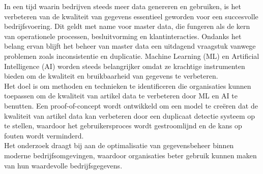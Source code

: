 In een tijd waarin bedrijven steeds meer data genereren en gebruiken, is het verbeteren van de kwaliteit van gegevens essentieel geworden voor een succesvolle bedrijfsvoering. Dit geldt met name voor master data, die fungeren als de kern van operationele processen, besluitvorming en klantinteracties. Ondanks het belang ervan blijft het beheer van master data een uitdagend vraagstuk vanwege problemen zoals inconsistentie en duplicatie. Machine Learning (ML) en Artificial Intelligence (AI) worden steeds belangrijker omdat ze krachtige instrumenten bieden om de kwaliteit en bruikbaarheid van gegevens te verbeteren.
\\
Het doel is om methoden en technieken te identificeren die organisaties kunnen toepassen om de kwaliteit van artikel data te verbeteren door ML en AI te benutten. Een proof-of-concept wordt ontwikkeld om een model te creëren dat de kwaliteit van artikel data kan verbeteren door een duplicaat detectie systeem op te stellen, waardoor het gebruikersproces wordt gestroomlijnd en de kans op fouten wordt verminderd. 
\\
Het onderzoek draagt bij aan de optimalisatie van gegevensbeheer binnen moderne bedrijfsomgevingen, waardoor organisaties beter gebruik kunnen maken van hun waardevolle bedrijfsgegevens.

